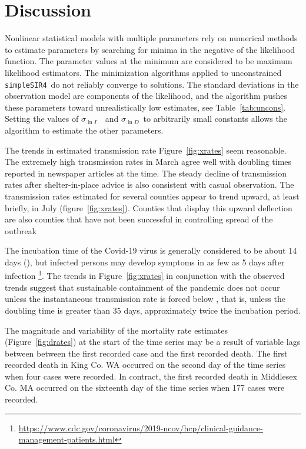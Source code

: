 \documentclass[12pt,letterpaper]{article}
\newcommand\help[1]{\color{Magenta}{\it #1 }\normalcolor}
\newcommand\SSm{{\tt simpleSIR4}}
\newcommand\slI{$\sigma_{\ln I}$\ }
\newcommand\slD{$\sigma_{\ln D}$}
\begin{document}
\section*{Discussion}

Nonlinear statistical models with multiple parameters rely
on numerical methods to estimate parameters by searching for minima
in the negative of the likelihood
function. The parameter values at the minimum are considered to be
maximum likelihood estimators.  The minimization algorithms applied to
unconstrained \SSm\ do not reliably converge to solutions. The
standard deviations in the observation model are components of the
likelihood, and the algorithm pushes these parameters toward
unrealistically low estimates, see Table~\ref{tab:uncons}.
Setting the values of
\slI\ and \slD\ to arbitrarily small constants allows the
algorithm to estimate the other parameters.

The trends in estimated transmission rate Figure~\ref{fig:xrates} seem
reasonable. The extremely high transmission rates in March agree well
with doubling times reported in newspaper articles at the time.
The steady decline of transmission rates after shelter-in-place advice is 
also consistent with casual observation.
The transmission rates estimated for several counties appear to trend
upward, at least briefly, in July (figure~\ref{fig:xrates}). Counties
that display this upward deflection are also counties that have not
been successful in controlling spread of the outbreak


The incubation time of the Covid-19 virus is generally considered to be
about 14 days (\cite{Someone2020}), but infected persons may develop
symptoms in as few as 5 days after infection \footnote{\url{
https://www.cdc.gov/coronavirus/2019-ncov/hcp/clinical-guidance-management-patients.html}}.
The trends in Figure~\ref{fig:xrates} in conjunction with the
observed trends suggest that sustainable containment of
the pandemic does not occur unless the instantaneous transmission rate
is forced below \help{ $0.018 da^{-1}$}, that is, unless the doubling
time is greater than 35 days, approximately twice the incubation
period.

The magnitude and variability of the mortality rate estimates
(Figure~\ref{fig:drates})
at the start of the time series may be a result of variable lags
between between the first recorded case and the first recorded death.
The first recorded death in King Co. WA occurred on the second day of
the time series when four cases were recorded.
In contract, the first recorded death in Middlesex Co. MA occurred on
the sixteenth day of the time series when 177 cases were recorded.
\end{document}
